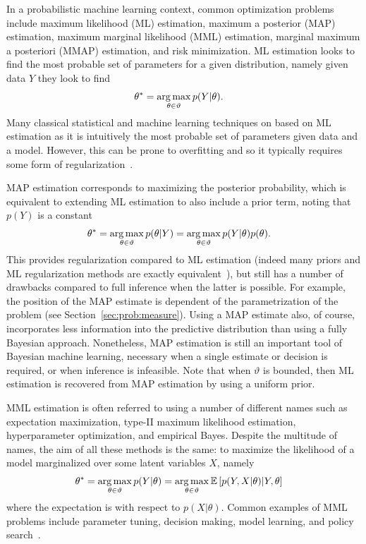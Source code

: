 In a probabilistic machine learning context, common optimization problems 
include maximum likelihood (ML) estimation,
maximum a posterior (MAP) estimation, maximum marginal likelihood (MML) estimation, 
marginal maximum a posteriori (MMAP) estimation,
and risk minimization.  
ML estimation looks to find the most probable set of parameters
for a given distribution, namely given data $Y$ they look to find
\begin{align}
\label{eq:opt:max-lik}
\theta^* &= \operatorname*{arg\,max}_{\theta \in \vartheta} p(Y|\theta).
\end{align}
Many classical statistical and machine learning techniques on based on 
ML estimation as it is intuitively the most probable
set of parameters given data and a model.  However, this can be prone to overfitting and
so it typically requires some form of regularization~\citep{hastie01statisticallearning}.

MAP estimation corresponds to maximizing the posterior probability, which is equivalent
to extending ML estimation to also include a prior term, noting that $p(Y)$ is a constant
\begin{align}
\label{eq:opt:map}
\theta^* &= \operatorname*{arg\,max}_{\theta \in \vartheta} p(\theta|Y) = \operatorname*{arg\,max}_{\theta \in \vartheta} p(Y|\theta) p(\theta).	
\end{align}
This provides regularization compared to ML estimation (indeed many priors and
ML regularization methods are exactly equivalent~\citep{bishop2006pattern}),
but still has a number of drawbacks compared to full inference when the latter is
possible.  For example, the position of the MAP estimate is dependent of the
parametrization of the problem (see Section~\ref{sec:prob:measure}).  Using a MAP estimate also, of course,
incorporates less information into the predictive distribution than using a
fully Bayesian approach.  Nonetheless, MAP estimation is still an important
tool of Bayesian machine learning, necessary when a single estimate or decision is required,
or when inference is infeasible.  Note that when $\vartheta$ is bounded, 
then ML estimation is recovered from MAP estimation by using
a uniform prior.

MML estimation is often referred to using a number of different names such as expectation
maximization, type-II maximum likelihood estimation, hyperparameter optimization, and
empirical Bayes.  Despite the multitude of names, the aim of all these methods is the 
same: to maximize the likelihood of a model
marginalized over some latent variables $X$, namely
\begin{align}
	\label{eq:opt:MML}
	\theta^* &= \operatorname*{arg\,max}_{\theta \in \vartheta} p(Y|\theta) 
	= \operatorname*{arg\,max}_{\theta \in \vartheta} \mathbb{E} \left[p(Y,X|\theta) | Y, \theta\right]
\end{align}
where the expectation is with respect to $p(X | \theta)$.  Common examples of MML
problems include parameter tuning, decision making, model learning, and policy search~\citep{deisenroth2013survey}.

